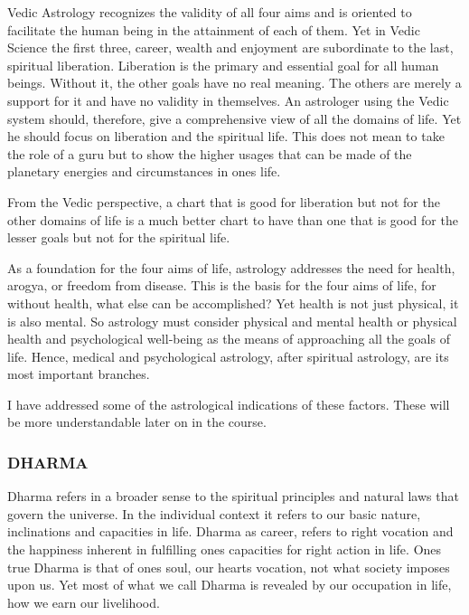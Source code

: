 Vedic Astrology recognizes the validity of all four aims and is oriented to facilitate the human being in the attainment of each of them. Yet in Vedic Science the first three, career, wealth and enjoyment are subordinate to the last, spiritual liberation. Liberation is the primary and essential goal for all human beings. Without it, the other goals have no real meaning. The others are merely a support for it and have no validity in themselves. An astrologer using the Vedic system should, therefore, give a comprehensive view of all the domains of life. Yet he should focus on liberation and the spiritual life. This does not mean to take the role of a guru but to show the higher usages that can be made of the planetary energies and circumstances in ones life.

 

From the Vedic perspective, a chart that is good for liberation but not for the other domains of life is a much better chart to have than one that is good for the lesser goals but not for the spiritual life.

 

As a foundation for the four aims of life, astrology addresses the need for health, arogya, or freedom from disease. This is the basis for the four aims of life, for without health, what else can be accompli­shed? Yet health is not just physical, it is also mental. So astrology must consider physical and mental health or physical health and psychological well‑being as the means of approaching all the goals of life. Hence, medical and psychological astrology, after spiritual astrology, are its most important branches.

 

I have addressed some of the astrological indications of these factors. These will be more understandable later on in the course.

 

 

\subsubsection{DHARMA}

 

Dharma refers in a broader sense to the spiritual principles and natural laws that govern the universe. In the individual context it refers to our basic nature, inclinations and capacities in life. Dharma as career, refers to right vocation and the happiness inherent in fulfilling ones capacities for right action in life. Ones true Dharma is that of ones soul, our hearts vocation, not what society imposes upon us. Yet most of what we call Dharma is revealed by our occupation in life, how we earn our livelihood.

